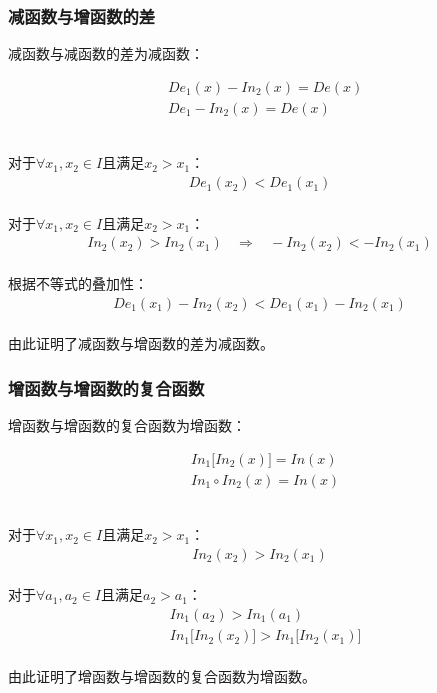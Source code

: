 \documentclass[UTF8]{ctexart}
\begin{document}
\subsubsection{减函数与增函数的差}
    \setcounter{equation}{0}
    减函数与减函数的差为减函数：
    \begin{large}
        \begin{align*}
            &De_1(x)-In_2(x)=De(x)\\[3mm]
            &De_1-In_2(x)=De(x)
        \end{align*}
    \end{large}\\
    对于$\forall x_1,x_2\in I$且满足$x_2>x_1$：
    \begin{align}
        De_1(x_2)<De_1(x_1)
    \end{align}\\
    对于$\forall x_1,x_2\in I$且满足$x_2>x_1$：\vspace{5pt}
    \begin{align}
        In_2(x_2)>In_2(x_1)~~~~\Longrightarrow~~~~-In_2(x_2)<-In_2(x_1)
    \end{align}\\
    根据不等式的叠加性：
    \begin{align}
        De_1(x_1)-In_2(x_2)<De_1(x_1)-In_2(x_1)
    \end{align}\\
    由此证明了减函数与增函数的差为减函数。\vspace{5pt}

\newpage

\subsubsection{增函数与增函数的复合函数}
    \setcounter{equation}{0}
    增函数与增函数的复合函数为增函数：
    \begin{large}
        \begin{align*}
            &In_1\big[In_2(x)\big]=In(x)\\[3mm]
            &In_1\circ In_2(x)=In(x)
        \end{align*}
    \end{large}\\
    对于$\forall x_1,x_2\in I$且满足$x_2>x_1$：
    \begin{align}
        In_2(x_2)>In_2(x_1)
    \end{align}\\
    对于$\forall a_1,a_2\in I$且满足$a_2>a_1$：
    \begin{align}
        &In_1(a_2)>In_1(a_1)\\[3mm]
        &In_1\big[In_2(x_2)\big]>In_1\big[In_2(x_1)\big]
    \end{align}\\
    由此证明了增函数与增函数的复合函数为增函数。\vspace{8pt}
\end{document}
